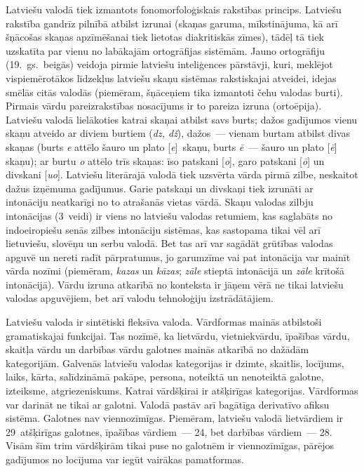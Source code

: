 \begin{multicols}{2}
Latviešu valodā tiek izmantots fonomorfoloģiskais rakstības princips.
Latviešu rakstība gandrīz pilnībā atbilst izrunai (skaņas garuma, mīkstinājuma, kā arī šņācošas skaņas apzīmēšanai tiek lietotas diakritiskās zīmes), tādēļ tā tiek uzskatīta par vienu no labākajām ortogrāfijas sistēmām.
Jauno ortogrāfiju (19.~gs.~beigās) veidoja pirmie latviešu inteliģences pārstāvji, kuri, meklējot vispiemērotākos līdzekļus latviešu skaņu sistēmas rakstiskajai atveidei, idejas smēlās citās valodās (piemēram, šņāceņiem tika izmantoti čehu valodas burti).
Pirmais vārdu pareizrakstības nosacījums ir to pareiza izruna (ortoēpija).
Latviešu valodā lielākoties katrai skaņai atbilst savs burts; dažos gadījumos vienu skaņu atveido ar diviem burtiem (\textit{dz, dž}), dažos~--- vienam burtam atbilst divas skaņas (burts \textit{e} attēlo šauro un plato [\textit{e}]~skaņu, burts \textit{ē}~--- šauro un plato [\textit{ē}] skaņu); ar burtu \textit{o} attēlo trīs skaņas: īso patskani [\textit{o}], garo patskani [\textit{ō}] un divskani [\textit{uo}].
Latviešu literārajā valodā tiek uzsvērta vārda pirmā zilbe, neskaitot dažus izņēmuma gadījumus.
Garie patskaņi un divskaņi tiek izrunāti ar intonāciju neatkarīgi no to atrašanās vietas vārdā.
Skaņu valodas zilbju intonācijas (3~veidi) ir viens no latviešu valodas retumiem, kas saglabāts no indoeiropiešu senās zilbes intonāciju sistēmas, kas sastopama tikai vēl arī lietuviešu, slovēņu un serbu valodā.
Bet tas arī var sagādāt grūtības valodas apguvē un nereti radīt pārpratumus, jo garumzīme vai pat intonācija var mainīt vārda nozīmi (piemēram, \textit{kazas} un \textit{kāzas}; \textit{zāle} stieptā intonācijā un \textit{zāle} krītošā intonācijā).
Vārdu izruna atkarībā no konteksta ir jāņem vērā ne tikai latviešu valodas apguvējiem, bet arī valodu tehnoloģiju izstrādātājiem.


Latviešu valoda ir sintētiski fleksīva valoda.  Vārdformas mainās atbilstoši gramatiskajai funkcijai.  Tas nozīmē, ka lietvārdu, vietniekvārdu, īpašības vārdu, skaitļa vārdu un darbības vārdu galotnes mainās atkarībā no dažādām kategorijām.  Galvenās latviešu valodas kategorijas ir dzimte, skaitlis, locījums, laiks, kārta, salīdzināmā pakāpe, persona, noteiktā un nenoteiktā galotne, izteiksme, atgriezeniskums.  Katrai vārdšķirai ir atšķirīgas kategorijas.  Vārdformas var darināt ne tikai ar galotni.  Valodā pastāv arī bagātīga derivatīvo afiksu sistēma.  \mbox{Galotnes} nav viennozīmīgas.  Piemēram, latviešu valodā lietvārdiem ir 29~atšķirīgas galotnes, īpašības vārdiem~--- 24, bet darbības vārdiem~--- 28. Visām šīm trim vārdšķirām tikai puse no galotnēm ir viennozīmīgas, pārējos gadījumos no locījuma var iegūt vairākas pamatformas.


\end{multicols}
